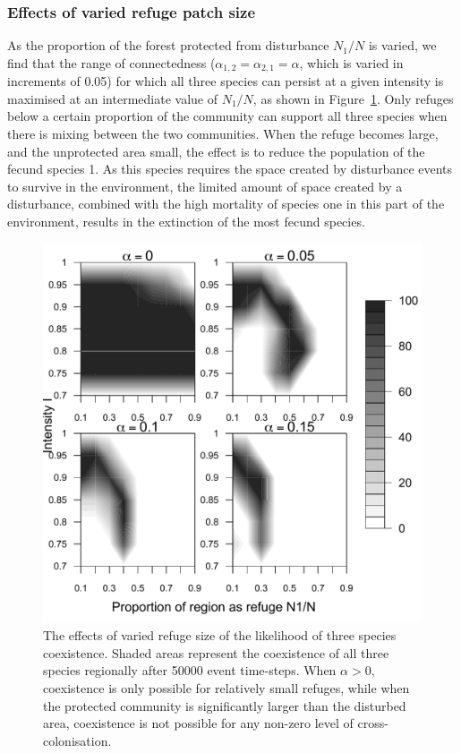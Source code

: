 \subsubsection{Effects of varied refuge patch size}
As the proportion of the forest protected from disturbance $N_1/N$ is varied, we find that the range of connectedness ($\alpha_{1,2}=\alpha_{2,1}=\alpha$, which is varied in increments of 0.05) for which all three species can persist at a given intensity is maximised at an intermediate value of $N_1/N$, as shown in Figure~\ref{fig:alpharange}. Only refuges below a certain proportion of the community can support all three species when there is mixing between the two communities. When the refuge becomes large, and the unprotected area small, the effect is to reduce the population of the fecund species 1. As this species requires the space created by disturbance events to survive in the environment, the limited amount of space created by a disturbance, combined with the high mortality of species one in this part of the environment, results in the extinction of the most fecund species.

\begin{figure}[ht]
\includegraphics[width=4.5in]{refugesize.pdf}
\caption[Effects of refuge size on multi-species coexistence]{The effects of varied refuge size of the likelihood of three species coexistence. Shaded areas represent the coexistence of all three species regionally after 50000 event time-steps. When $\alpha>0$, coexistence is only possible for relatively small refuges, while when the protected community is significantly larger than the disturbed area, coexistence is not possible for any non-zero level of cross-colonisation.}
\label{fig:alpharange}
\end{figure}

